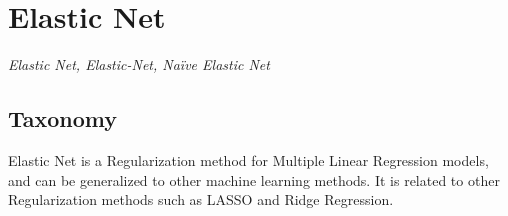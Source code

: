 
\section{Elastic Net} 
\label{sec:elasticnet}

\emph{Elastic Net, Elastic-Net, Na\"ive Elastic Net}

\subsection{Taxonomy}
Elastic Net is a Regularization method for Multiple Linear Regression models, and can be generalized to other machine learning methods.
It is related to other Regularization methods such as LASSO and Ridge Regression.

